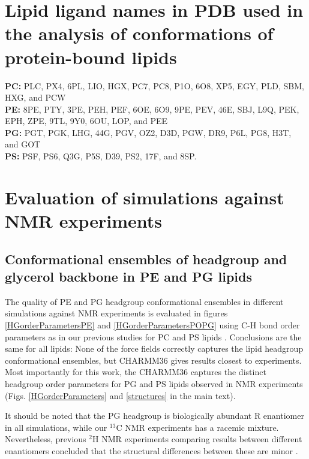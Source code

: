 \documentclass[journal=jpcbfk]{achemso}
\begin{document}
\clearpage
\section{Lipid ligand names in PDB used in the analysis of conformations of protein-bound lipids}
{\bf PC:} PLC, PX4, 6PL, LIO, HGX, PC7, PC8, P1O, 6O8, XP5, EGY, PLD, SBM, HXG, and PCW \\
{\bf PE:} 8PE, PTY, 3PE, PEH, PEF, 6OE, 6O9, 9PE, PEV, 46E, SBJ, L9Q, PEK, EPH, ZPE, 9TL, 9Y0, 6OU, LOP, and PEE \\
{\bf PG:} PGT, PGK, LHG, 44G, PGV, OZ2, D3D, PGW, DR9, P6L, PG8, H3T, and GOT \\
{\bf PS:} PSF, PS6, Q3G, P5S, D39, PS2, 17F, and 8SP.

\clearpage
\section{Evaluation of simulations against NMR experiments}
\subsection{Conformational ensembles of headgroup and glycerol backbone in PE and PG lipids}

The quality of PE and PG headgroup conformational ensembles in different simulations against NMR experiments is evaluated in figures \ref{HGorderParametersPE} and \ref{HGorderParametersPOPG} using C-H bond order parameters as in our previous studies for PC and PS lipids \cite{botan15,antila19}. Conclusions are the same for all lipids: None of the force fields correctly captures the lipid headgroup conformational ensembles, but CHARMM36 gives results closest to experiments. Most importantly for this work, the CHARMM36 captures the distinct headgroup order parameters for PG and PS lipids observed in NMR experiments (Figs. \ref{HGorderParameters} and \ref{structures} in the main text). 

It should be noted that the PG headgroup is biologically abundant R enantiomer in all simulations, while our $^{13}$C NMR experiments has a racemic mixture. Nevertheless, previous $^{2}$H NMR experiments comparing results between different enantiomers concluded that the structural differences between these are minor \cite{wohlgemuth80}.

\end{document}
